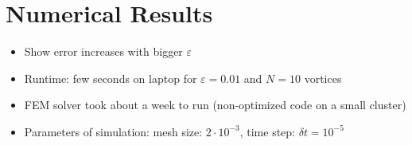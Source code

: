 \documentclass[12pt, a4paper]{article}
\theoremstyle{plain}
\theoremstyle{definition}
\begin{document}
\section{Numerical Results}
\begin{itemize}
    \item Show error increases with bigger $\varepsilon$
    \item Runtime: few seconds on laptop for $\varepsilon = 0.01$ and $N=10$ vortices
    \item FEM solver took about a week to run (non-optimized code on a small cluster)
    \item Parameters of simulation: mesh size: $2 \cdot 10^{-3}$, time step: $\delta t = 10^{-5}$
\end{itemize}

\newpage
\printbibliography
\end{document}
